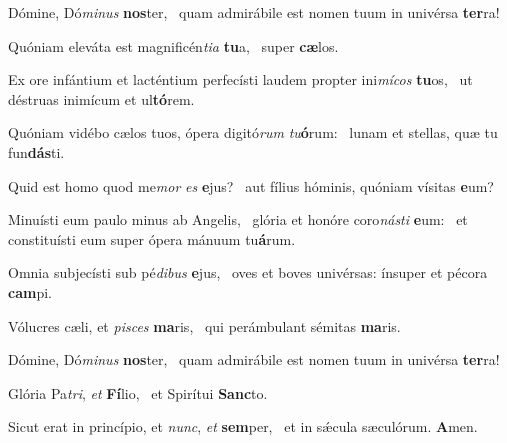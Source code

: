 \item Dómine, Dó\textit{mi}\textit{nus} \textbf{nos}ter,~\psstar{} quam admirábile est nomen tuum in univérsa \textbf{ter}ra!
\item Quóniam eleváta est magnificén\textit{ti}\textit{a} \textbf{tu}a,~\psstar{} super \textbf{cæ}los.
\item Ex ore infántium et lacténtium perfecísti laudem propter ini\textit{mí}\textit{cos} \textbf{tu}os,~\psstar{} ut déstruas inimícum et ul\textbf{tó}rem.
\item Quóniam vidébo cælos tuos, ópera digitó\textit{rum} \textit{tu}\textbf{ó}rum:~\psstar{} lunam et stellas, quæ tu fun\textbf{dás}ti.
\item Quid est homo quod me\textit{mor} \textit{es} \textbf{e}jus?~\psstar{} aut fílius hóminis, quóniam vísitas \textbf{e}um?
\item Minuísti eum paulo minus ab Angelis,~\pscross{} glória et honóre coro\textit{nás}\textit{ti} \textbf{e}um:~\psstar{} et constituísti eum super ópera mánuum tu\textbf{á}rum.
\item Omnia subjecísti sub pé\textit{di}\textit{bus} \textbf{e}jus,~\psstar{} oves et boves univérsas: ínsuper et pécora \textbf{cam}pi.
\item Vólucres cæli, et \textit{pi}\textit{sces} \textbf{ma}ris,~\psstar{} qui perámbulant sémitas \textbf{ma}ris.
\item Dómine, Dó\textit{mi}\textit{nus} \textbf{nos}ter,~\psstar{} quam admirábile est nomen tuum in univérsa \textbf{ter}ra!
\item Glória Pa\textit{tri}, \textit{et} \textbf{Fí}lio,~\psstar{} et Spirítui \textbf{Sanc}to.
\item Sicut erat in princípio, et \textit{nunc}, \textit{et} \textbf{sem}per,~\psstar{} et in sǽcula sæculórum. \textbf{A}men.
